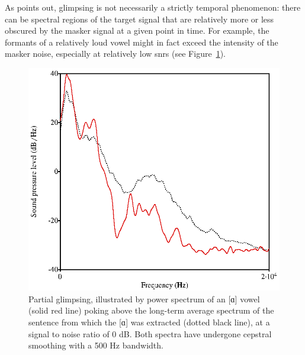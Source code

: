 As \citet{Cooke2006} points out, glimpsing is not necessarily a strictly temporal phenomenon: there can be spectral regions of the target signal that are relatively more or less obscured by the masker signal at a given point in time.  For example, the formants of a relatively loud vowel might in fact exceed the intensity of the masker noise, especially at relatively low \ac{snr}s (see Figure~\ref{fig:PartialGlimpsing}).

\begin{figure}[htbp]
	\begin{centering}
	\includegraphics{figures/partialGlimpsing.eps}
	\caption[Partial glimpsing of an {[ɑ]} vowel]{Partial glimpsing, illustrated by power spectrum of an [ɑ] vowel (solid red line) poking above the long-term average spectrum of the sentence from which the [ɑ] was extracted (dotted black line), at a signal to noise ratio of 0 dB. Both spectra have undergone cepstral smoothing with a 500 Hz bandwidth.\label{fig:PartialGlimpsing}}
	\end{centering}
\end{figure}

